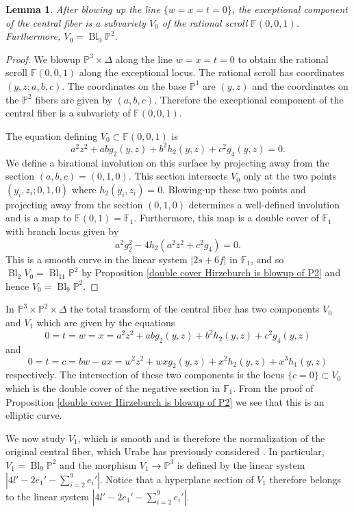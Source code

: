 \documentclass[a4paper]{amsart}
\theoremstyle{definition}
\theoremstyle{plain}
\newtheorem{lemma}[defn]{Lemma}
\theoremstyle{remark}
\newcommand{\PS}{\mathbb{P}}
\newcommand{\F}{\mathbb{F}}
\begin{document}
\begin{lemma}\label{Skewlines blowup}
After blowing up the line $\{w=x=t=0\}$, the  exceptional component of the central fiber is a subvariety $V_0$ of the rational scroll $\F(0,0,1)$. Furthermore, $V_0=\operatorname{Bl}_{9}\PS^2$.
\end{lemma}

\begin{proof}
We blowup $\PS^3 \times \Delta$ along the line $w=x=t=0$ to obtain the rational scroll $\F(0,0,1)$ along the exceptional locus. The rational scroll has coordinates $(y,z;a,b,c)$. The coordinates on the base $\PS^1$ are $(y,z)$ and the coordinates on the $\PS^2$ fibers are given by $(a,b,c)$. Therefore the exceptional component of the central fiber is a subvariety of $\F(0,0,1)$.

The equation defining $V_0 \subset \F(0,0,1)$ is
$$a^2z^2+abg_2(y,z)+b^2h_2(y,z)+c^2g_4(y,z)=0.$$
We define a birational involution on this surface by projecting away from the section $(a,b,c)=(0,1,0)$. This section intersects $V_0$ only at the two points $(y_i,z_i;0,1,0)$ where $h_2(y_i,z_i)=0$. Blowing-up these two points and projecting away from the section $(0,1,0)$ determines a well-defined involution and is a map to $\F(0,1) = \F_1$. Furthermore, this map is a double cover of $\F_1$ with branch locus given by 
$$a^2g_2^2-4h_2(a^2z^2+c^2g_4)=0.$$
This is a smooth curve in the linear system $|2s+6f|$ in $\F_1$, and so $\operatorname{Bl}_2V_0=\operatorname{Bl}_{11}\PS^2$ by Proposition \ref{double cover Hirzeburch is blowup of P2} and hence $V_0=\operatorname{Bl}_9\PS^2$.
\end{proof}

In $\PS^3\times \PS^2\times \Delta$ the total transform of the central fiber has two components $V_0$ and $V_1$ which are given by the equations
$$0=t=w=x=a^2z^2+abg_2(y,z)+b^2h_2(y,z)+c^2g_4(y,z)$$
and
$$0=t=c=bw-ax=w^2z^2+wxg_2(y,z)+x^2h_2(y,z)+x^3h_1(y,z)$$
respectively. The intersection of these two components is the locus $\{c=0\}\subset V_0$ which is the double cover of the negative section in $\F_1$. From the proof of Proposition \ref{double cover Hirzeburch is blowup of P2} we see that this is an elliptic curve.

We now study $V_1$, which is smooth and is therefore the normalization of the original central fiber, which Urabe has previously considered \cite[III-C]{Ura86}. In particular, $V_1 = \operatorname{Bl}_9\PS^2$ and the morphism $V_1 \rightarrow \PS^3$ is defined by the linear system $|4l'-2e_1'-\sum_{i=2}^9e_i'|$. Notice that a hyperplane section of $V_1$ therefore belongs to the linear system $|4l'-2e_1'-\sum_{i=2}^9e_i'|$.
\end{document}
